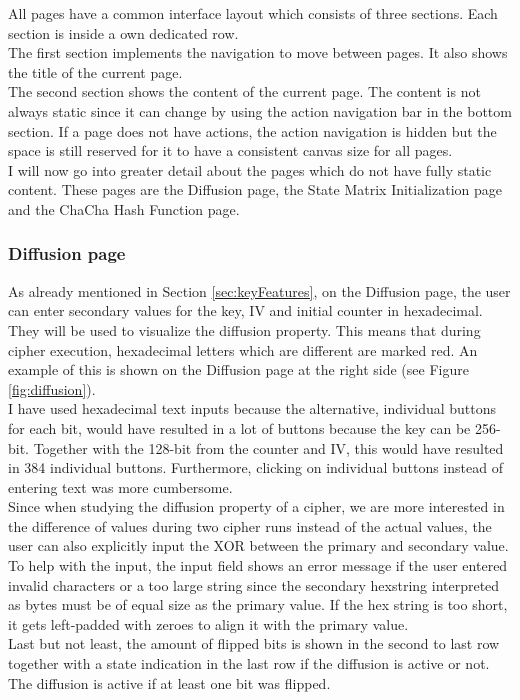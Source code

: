 All pages have a common interface layout which consists of three sections. Each section is inside a own dedicated row. \\
The first section implements the navigation to move between pages. It also shows the title of the current page. \\
The second section shows the content of the current page. The content is not always static since it can change by using the action navigation bar in the bottom section. If a page does not have actions, the action navigation is hidden but the space is still reserved for it to have a consistent canvas size for all pages. \\
I will now go into greater detail about the pages which do not have fully static content. These pages are the Diffusion page, the State Matrix Initialization page and the ChaCha Hash Function page.

\subsubsection{Diffusion page}

As already mentioned in Section \ref{sec:keyFeatures}, on the Diffusion page, the user can enter secondary values for the key, IV and initial counter in hexadecimal. They will be used to visualize the diffusion property. This means that during cipher execution, hexadecimal letters which are different are marked red. An example of this is shown on the Diffusion page at the right side (see Figure \ref{fig:diffusion}).\\
I have used hexadecimal text inputs because the alternative, individual buttons for each bit, would have resulted in a lot of buttons because the key can be 256-bit. Together with the 128-bit from the counter and IV, this would have resulted in 384 individual buttons. Furthermore, clicking on individual buttons instead of entering text was more cumbersome. {\color{red} \\
Since when studying the diffusion property of a cipher, we are more interested in the difference of values during two cipher runs instead of the actual values, the user can also explicitly input the XOR between the primary and secondary value.} \\
To help with the input, the input field shows an error message if the user entered invalid characters or a too large string since the secondary hexstring interpreted as bytes must be of equal size as the primary value. If the hex string is too short, it gets left-padded with zeroes to align it with the primary value. \\
Last but not least, the amount of flipped bits is shown in the second to last row together with a state indication in the last row if the diffusion is active or not. The diffusion is active if at least one bit was flipped.

